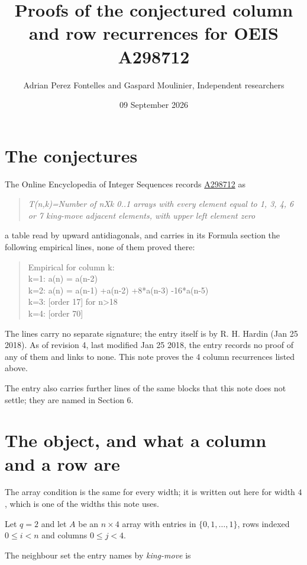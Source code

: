 \documentclass[11pt]{article}
\title{Proofs of the conjectured column and row recurrences for OEIS A298712}
\author{Adrian Perez Fontelles and Gaspard Moulinier, Independent researchers}
\date{09 September 2026}
\theoremstyle{definition}
\begin{document}
\maketitle
\section{The conjectures}

The Online Encyclopedia of Integer Sequences records \href{https://oeis.org/A298712}{A298712} as

\begin{quote}\itshape T(n,k)=Number of nXk 0..1 arrays with every element equal to 1, 3, 4, 6 or 7 king-move adjacent elements, with upper left element zero\end{quote}

a table read by upward antidiagonals, and carries in its Formula section the following empirical lines, none of them proved there:

\begin{quote}\ttfamily Empirical for column k:\\
k=1: a(n) = a(n-2)\\k=2: a(n) = a(n-1) +a(n-2) +8*a(n-3) -16*a(n-5)\\k=3: [order 17] for n>18\\k=4: [order 70]\end{quote}

The lines carry no separate signature; the entry itself is by R. H. Hardin (Jan 25 2018). As of revision 4, last modified Jan 25 2018, the entry records no proof of any of them and links to none. This note proves the 4 column recurrences listed above.

The entry also carries further lines of the same blocks that this note does not settle; they are named in Section 6.

\section{The object, and what a column and a row are}

The array condition is the same for every width; it is written out here for width $4$, which is one of the widths this note uses.

Let $q = 2$ and let $A$ be an $n \times 4$ array with entries in $\{0,1,\dots,1\}$, rows indexed $0 \le i < n$ and columns $0 \le j < 4$.

The neighbour set the entry names by {\itshape king-move} is
\end{document}
